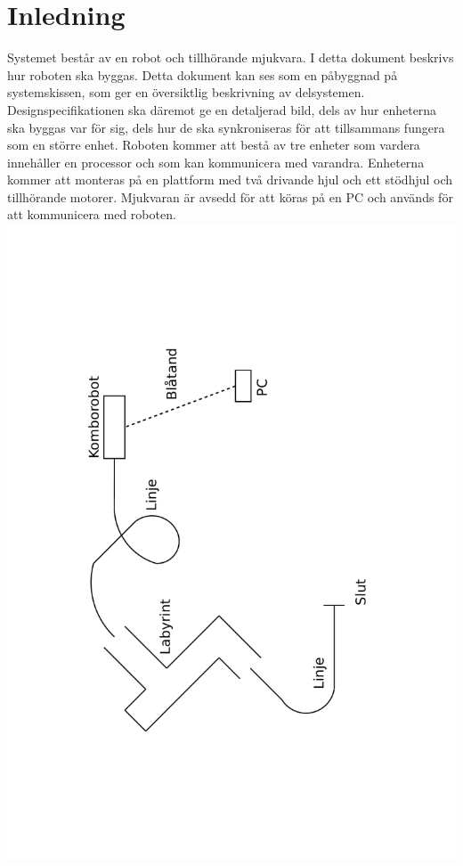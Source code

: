 \section{Inledning}
Systemet består av en robot och tillhörande mjukvara. I detta dokument beskrivs hur roboten ska byggas. Detta dokument kan ses som en påbyggnad på systemskissen, som ger en översiktlig beskrivning av delsystemen. Designspecifikationen ska däremot ge en detaljerad bild, dels av hur enheterna ska byggas var för sig, dels hur de ska synkroniseras för att tillsammans fungera som en större enhet.
Roboten kommer att bestå av tre enheter som vardera innehåller en processor och som kan kommunicera med varandra. 
Enheterna kommer att monteras på en plattform med två drivande hjul och ett stödhjul och tillhörande motorer.
Mjukvaran är avsedd för att köras på en PC och används för att kommunicera med roboten.
\includegraphics[angle=270,scale=0.5]{Oversikt.pdf}